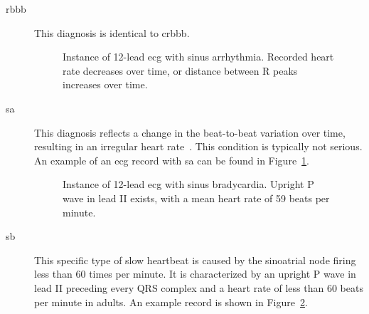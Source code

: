 \documentclass[\main/thesis.tex]{subfiles}
\begin{document}
\begin{description}
    \item[\gls{rbbb}] This diagnosis is identical to \gls{crbbb}.

    \begin{figure}[H]
        \centering
        \caption{Instance of 12-lead \gls{ecg} with sinus arrhythmia. Recorded heart rate decreases over time, or distance between R peaks increases over time.}
        \label{fig:full_SA}
    \end{figure}
    \item[\gls{sa}] This diagnosis reflects a change in the beat-to-beat variation over time, resulting in an irregular heart rate~\cite{surawicz_borys_ahaaccfhrs_2009}.
    This condition is typically not serious.
    An example of an \gls{ecg} record with \gls{sa} can be found in Figure~\ref{fig:full_SA}.

    \begin{figure}[H]
        \centering
        \caption{Instance of 12-lead \gls{ecg} with sinus bradycardia. Upright P wave in lead II exists, with a mean heart rate of 59 beats per minute.}
        \label{fig:full_SB}
    \end{figure}
    \item[\gls{sb}] This specific type of slow heartbeat is caused by the sinoatrial node firing less than 60 times per minute.
    It is characterized by an upright P wave in lead II preceding every QRS complex and a heart rate of less than 60 beats per minute in adults.
    An example record is shown in Figure~\ref{fig:full_SB}.


\end{description}
\end{document}
